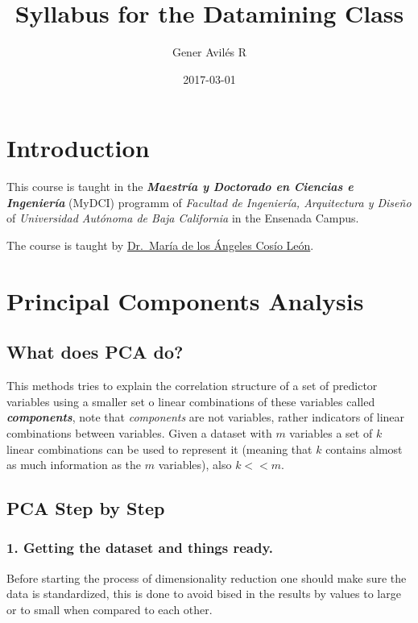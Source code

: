 \documentclass[]{book}
\title{Syllabus for the Datamining Class}
\author{Gener Avilés R}
\date{2017-03-01}
\begin{document}
\maketitle

{
\setcounter{tocdepth}{1}
\tableofcontents
}
\chapter{Introduction}\label{introduction}

This course is taught in the \textbf{\emph{Maestría y Doctorado en
Ciencias e Ingeniería}} (MyDCI) programm of \emph{Facultad de
Ingeniería, Arquitectura y Diseño} of \emph{Universidad Autónoma de Baja
California} in the Ensenada Campus.

The course is taught by
\href{https://www.researchgate.net/profile/Maria_Cosio_Leon}{Dr.~María
de los Ángeles Cosío León}.

\chapter{Principal Components Analysis}\label{intro}

\section{What does PCA do?}\label{what-does-pca-do}

This methods tries to explain the correlation structure of a set of
predictor variables using a smaller set o linear combinations of these
variables called \textbf{\emph{components}}, note that \emph{components}
are not variables, rather indicators of linear combinations between
variables. Given a dataset with \(m\) variables a set of \(k\) linear
combinations can be used to represent it (meaning that \(k\) contains
almost as much information as the \(m\) variables), also \(k<<m\).

\section{PCA Step by Step}\label{pca-step-by-step}

\subsection{1. Getting the dataset and things
ready.}\label{getting-the-dataset-and-things-ready.}

Before starting the process of dimensionality reduction one should make
sure the data is standardized, this is done to avoid bised in the
results by values to large or to small when compared to each other.
\end{document}
